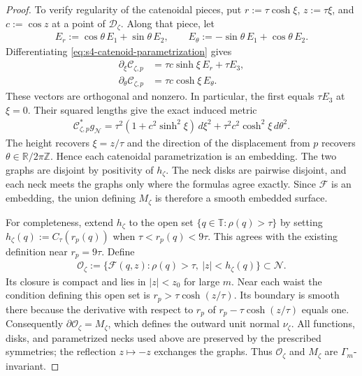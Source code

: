 \documentclass[a4paper,11pt,oneside,reqno]{amsart}
\numberwithin{equation}{section}
\theoremstyle{definition}
\begin{document}
\begin{proof}
    To verify regularity of the catenoidal pieces, put
    $r:=\tau\cosh\xi$, $z:=\tau\xi$, and
    $c:=\cos z$ at a point of $\mathcal D_\zeta$.
    Along that piece, let
    \begin{align*}
        E_r:=\cos\theta\,E_1+\sin\theta\,E_2,
        \qquad
        E_\theta:=-\sin\theta\,E_1+\cos\theta\,E_2.
    \end{align*}
    Differentiating \eqref{eq:s4-catenoid-parametrization}
    gives
    \begin{align*}
        \partial_\xi\mathcal C_{\zeta,p}
        &=\tau c\sinh\xi\,E_r+\tau E_3,\\
        \partial_\theta\mathcal C_{\zeta,p}
        &=\tau c\cosh\xi\,E_\theta.
    \end{align*}
    These vectors are orthogonal and nonzero. In particular,
    the first equals $\tau E_3$ at $\xi=0$.
    Their squared lengths give the exact induced metric
    \begin{align*}
        \mathcal C_{\zeta,p}^*g_{\mathcal N}
        =\tau^2(1+c^2\sinh^2\xi)\,d\xi^2
          +\tau^2c^2\cosh^2\xi\,d\theta^2.
    \end{align*}
    The height recovers $\xi=z/\tau$ and the direction
    of the displacement from $p$ recovers
    $\theta\in\mathbb R/2\pi\mathbb Z$. Hence each
    catenoidal parametrization is an embedding.
    The two graphs are disjoint by positivity of
    $h_\zeta$. The neck disks are pairwise disjoint,
    and each neck meets the graphs only where the formulas
    agree exactly. Since $\mathcal F$ is an embedding,
    the union defining $M_\zeta$ is therefore a smooth
    embedded surface.

    For completeness, extend $h_\zeta$ to the open set
    $\{q\in\mathbb T:\rho(q)>\tau\}$ by setting
    $h_\zeta(q):=C_\tau(r_p(q))$ when
    $\tau<r_p(q)<9\tau$. This agrees with the existing
    definition near $r_p=9\tau$. Define
    \begin{align*}
        \mathcal O_\zeta
        :=\{\mathcal F(q,z):
              \rho(q)>\tau,\ |z|<h_\zeta(q)\}
        \subset\mathcal N.
    \end{align*}
    Its closure is compact and lies in $|z|<z_0$ for
    large $m$. Near each waist the condition defining
    this open set is
    $r_p>\tau\cosh(z/\tau)$. Its boundary is smooth
    there because the derivative with respect to $r_p$
    of $r_p-\tau\cosh(z/\tau)$ equals one.
    Consequently $\partial\mathcal O_\zeta=M_\zeta$,
    which defines the outward unit normal $\nu_\zeta$.
    All functions, disks, and parametrized necks used above
    are preserved by the prescribed symmetries; the
    reflection $z\mapsto-z$ exchanges the graphs.
    Thus $\mathcal O_\zeta$ and $M_\zeta$ are
    $\Gamma_m$-invariant.


\end{proof}
\end{document}
